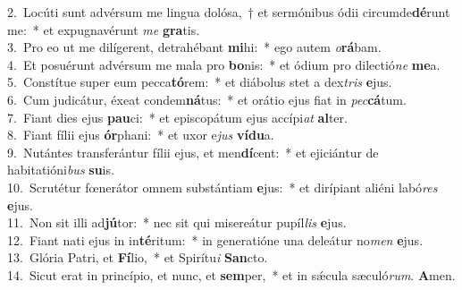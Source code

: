 {2.~}Locúti sunt advérsum me lingua dolósa,~† et sermónibus ódii circumde\textbf{dé}runt me:~* et expugnavérunt \textit{me} \textbf{gra}tis.\\
{3.~}Pro eo ut me dilígerent, detrahébant \textbf{mi}hi:~* ego autem \textit{o}\textbf{rá}bam.\\
{4.~}Et posuérunt advérsum me mala pro \textbf{bo}nis:~* et ódium pro dilectió\textit{ne} \textbf{me}a.\\
{5.~}Constítue super eum pecca\textbf{tó}rem:~* et diábolus stet a dex\textit{tris} \textbf{e}jus.\\
{6.~}Cum judicátur, éxeat condem\textbf{ná}tus:~* et orátio ejus fiat in \textit{pec}\textbf{cá}tum.\\
{7.~}Fiant dies ejus \textbf{pau}ci:~* et episcopátum ejus accípi\textit{at} \textbf{al}ter.\\
{8.~}Fiant fílii ejus \textbf{ór}phani:~* et uxor e\textit{jus} \textbf{ví}\textbf{du}a.\\
{9.~}Nutántes transferántur fílii ejus, et men\textbf{dí}cent:~* et ejiciántur de habitatióni\textit{bus} \textbf{su}is.\\
{10.~}Scrutétur fœnerátor omnem substántiam \textbf{e}jus:~* et dirípiant aliéni labó\textit{res} \textbf{e}jus.\\
{11.~}Non sit illi ad\textbf{jú}tor:~* nec sit qui misereátur pupíl\textit{lis} \textbf{e}jus.\\
{12.~}Fiant nati ejus in in\textbf{té}ritum:~* in generatióne una deleátur no\textit{men} \textbf{e}jus.\\
{13.~}Glória Patri, et \textbf{Fí}lio,~* et Spirítu\textit{i} \textbf{San}cto.\\
{14.~}Sicut erat in princípio, et nunc, et \textbf{sem}per,~* et in sǽcula sæculó\textit{rum}. \textbf{A}men.\\
